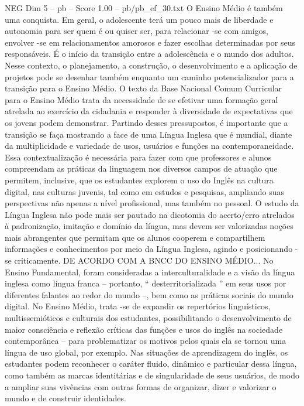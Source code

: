 \begin{textsample}{NEG Dim 5 – pb – Score 1.00 – pb/pb\_ef\_30.txt}
O Ensino Médio é também uma conquista.
Em geral, o adolescente terá um pouco mais de liberdade e autonomia para ser quem é ou quiser ser, para relacionar -se com amigos, envolver -se em relacionamentos amorosos e fazer escolhas determinadas por seus responsáveis.
É o início da transição entre a adolescência e o mundo dos adultos.
Nesse contexto, o planejamento, a construção, o desenvolvimento e a aplicação de projetos pode se desenhar também enquanto um caminho potencializador para a transição para o Ensino Médio.
O texto da Base Nacional Comum Curricular para o Ensino Médio trata da necessidade de se efetivar uma formação geral atrelada ao exercício da cidadania e responder à diversidade de expectativas que os jovens podem demonstrar.
Partindo desses pressupostos, é importante que a transição se faça mostrando a face de uma Língua Inglesa que é mundial, diante da multiplicidade e variedade de usos, usuários e funções na contemporaneidade.
Essa contextualização é necessária para fazer com que professores e alunos compreendam as práticas da linguagem nos diversos campos de atuação que permitem, inclusive, que os estudantes explorem o uso do Inglês na cultura digital, nas culturas juvenis, tal como em estudos e pesquisas, ampliando suas perspectivas não apenas a nível profissional, mas também no pessoal.
O estudo da Língua Inglesa não pode mais ser pautado na dicotomia do acerto/erro atrelados à padronização, imitação e domínio da língua, mas devem ser valorizadas noções mais abrangentes que permitam que os alunos cooperem e compartilhem informações e conhecimentos por meio da Língua Inglesa, agindo e posicionando -se criticamente.
DE ACORDO COM A BNCC DO ENSINO MÉDIO...
No Ensino Fundamental, foram consideradas a interculturalidade e a visão da língua inglesa como língua franca – portanto, “ desterritorializada ” em seus usos por diferentes falantes ao redor do mundo –, bem como as práticas sociais do mundo digital.
No Ensino Médio, trata -se de expandir os repertórios linguísticos, multissemióticos e culturais dos estudantes, possibilitando o desenvolvimento de maior consciência e reflexão críticas das funções e usos do inglês na sociedade contemporânea – para problematizar os motivos pelos quais ela se tornou uma língua de uso global, por exemplo.
Nas situações de aprendizagem do inglês, os estudantes podem reconhecer o caráter fluido, dinâmico e particular dessa língua, como também as marcas identitárias e de singularidade de seus usuários, de modo a ampliar suas vivências com outras formas de organizar, dizer e valorizar o mundo e de construir identidades.

\end{textsample}
